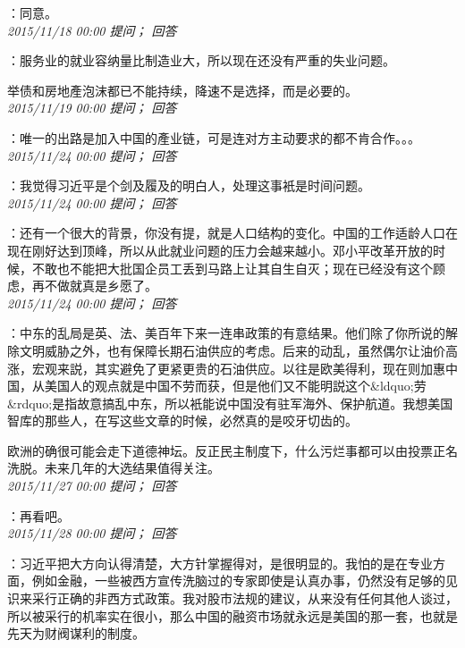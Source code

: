 \documentclass[twocolumn]{ctexart}
\begin{document}
：同意。\\

\textit{\hfill\noindent\small 2015/11/18 00:00 提问； 回答}

：服务业的就业容纳量比制造业大，所以现在还没有严重的失业问题。

举债和房地產泡沫都已不能持续，降速不是选择，而是必要的。\\

\textit{\hfill\noindent\small 2015/11/19 00:00 提问； 回答}

：唯一的出路是加入中国的產业链，可是连对方主动要求的都不肯合作。。。\\

\textit{\hfill\noindent\small 2015/11/24 00:00 提问； 回答}

：我觉得习近平是个剑及履及的明白人，处理这事衹是时间问题。\\

\textit{\hfill\noindent\small 2015/11/24 00:00 提问； 回答}

：还有一个很大的背景，你没有提，就是人口结构的变化。中国的工作适龄人口在现在刚好达到顶峰，所以从此就业问题的压力会越来越小。邓小平改革开放的时候，不敢也不能把大批国企员工丢到马路上让其自生自灭；现在已经没有这个顾虑，再不做就真是乡愿了。\\

\textit{\hfill\noindent\small 2015/11/24 00:00 提问； 回答}

：中东的乱局是英、法、美百年下来一连串政策的有意结果。他们除了你所说的解除文明威胁之外，也有保障长期石油供应的考虑。后来的动乱，虽然偶尔让油价高涨，宏观来説，其实避免了更紧更贵的石油供应。以往是欧美得利，现在则加惠中国，从美国人的观点就是中国不劳而获，但是他们又不能明説这个\&ldquo;劳\&rdquo;是指故意搞乱中东，所以衹能说中国没有驻军海外、保护航道。我想美国智库的那些人，在写这些文章的时候，必然真的是咬牙切齿的。

欧洲的确很可能会走下道德神坛。反正民主制度下，什么污烂事都可以由投票正名洗脱。未来几年的大选结果值得关注。\\

\textit{\hfill\noindent\small 2015/11/27 00:00 提问； 回答}

：再看吧。\\

\textit{\hfill\noindent\small 2015/11/28 00:00 提问； 回答}

：习近平把大方向认得清楚，大方针掌握得对，是很明显的。我怕的是在专业方面，例如金融，一些被西方宣传洗脑过的专家即使是认真办事，仍然没有足够的见识来采行正确的非西方式政策。我对股市法规的建议，从来没有任何其他人谈过，所以被采行的机率实在很小，那么中国的融资市场就永远是美国的那一套，也就是先天为财阀谋利的制度。\\
\end{document}
